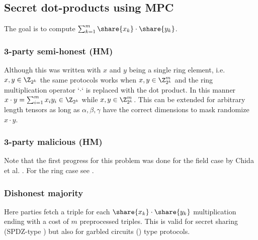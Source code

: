\subsection{Secret dot-products using MPC}

The goal is to compute $\sum_{k=1}^m \share{x_k} \cdot \share{y_k}$.

\subsubsection{3-party semi-honest (HM)}

Although this was written with $x$ and $y$ being a single ring element,
i.e. $x,y \in \Z_{2^k}$ the same protocols works when $x, y \in \Z^m_{2^k}$
and the ring multiplication operator `$\cdot$` is replaced with the dot
product. In this manner $x \cdot y = \sum_{i=1}^m x_i y_i \in \Z_{2^k}$ while
$x, y \in \Z^m_{2^k}$. This can be extended for arbitrary length tensors as long as
$\alpha, \beta, \gamma$ have the correct dimensions to mask randomize $x \cdot y$.

\subsubsection{3-party malicious (HM)}
Note that the first progress
for this problem was done for the field case by Chida et al. \cite{C:CGHIKL18}.
For the ring case see \cite{EPRINT:ADEN19,cryptoeprint:2020:1330}.

\subsubsection{Dishonest majority}

Here parties fetch a triple for each $\share{x_k} \cdot \share{y_k}$ multiplication
ending with a cost of $m$ preprocessed triples. This is valid for secret sharing (SPDZ-type
\cite{EC:KelPasRot18,C:DPSZ12,C:CDESX18})
but also for garbled circuits (\cite{AC:HazSchSor17,CCS:WanRanKat17b}) type protocols.

